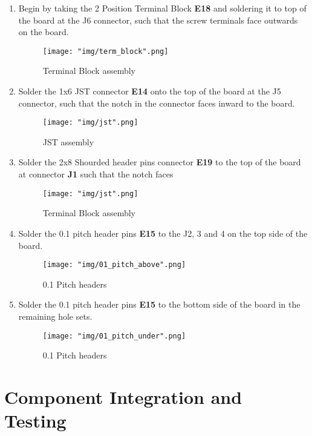\documentclass[12pt]{article}
\begin{document}
\begin{enumerate}

	\item Begin by taking the 2 Position Terminal Block \textbf{E18} and soldering it to top of the board at the J6 connector, such that the screw terminals face outwards on the board. 


\begin{figure}[H]
	\centering
	\texttt{[image: "img/term\_block".png]}
	\caption{Terminal Block assembly}
\end{figure}


	\item Solder the 1x6 JST connector \textbf{E14} onto the top of the board at the J5 connector, such that the notch in the connector faces inward to the board.

\begin{figure}[H]
	\centering
	\texttt{[image: "img/jst".png]}
	\caption{JST assembly}
\end{figure}

	\item Solder the 2x8 Shourded header pins connector \textbf{E19} to the top of the board at connector \textbf{J1} such that the notch faces 

\begin{figure}[H]
	\centering
	\texttt{[image: "img/jst".png]}
	\caption{Terminal Block assembly}
\end{figure}

	\item Solder the 0.1 pitch header pins \textbf{E15} to the J2, 3 and 4 on the top side of the board. 

\begin{figure}[H]
	\centering
	\texttt{[image: "img/01\_pitch\_above".png]}
	\caption{0.1 Pitch headers}
\end{figure}

	\item Solder the 0.1 pitch header pins \textbf{E15} to the bottom side of the board in the remaining hole sets.

\begin{figure}[H]
	\centering
	\texttt{[image: "img/01\_pitch\_under".png]}
	\caption{0.1 Pitch headers}
\end{figure}

\end{enumerate}

\section{Component Integration and Testing}
\end{document}
